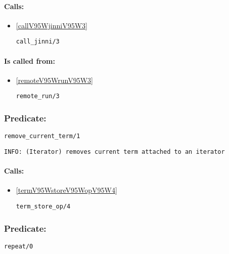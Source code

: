 \paragraph{Calls:} 
\begin{itemize}
\item \ref{callV95WjinniV95W3} 
\begin{verbatim}
call_jinni/3
\end{verbatim}

\end{itemize}
\paragraph{Is called from:} 
\begin{itemize}
\item \ref{remoteV95WrunV95W3} 
\begin{verbatim}
remote_run/3
\end{verbatim}

\end{itemize}

\subsubsection{Predicate:} \label{removeV95WcurrentV95WtermV95W1}

\begin{verbatim}
remove_current_term/1
\end{verbatim}

{\small \begin{verbatim}
INFO: (Iterator) removes current term attached to an iterator

\end{verbatim}}
\paragraph{Calls:} 
\begin{itemize}
\item \ref{termV95WstoreV95WopV95W4} 
\begin{verbatim}
term_store_op/4
\end{verbatim}

\end{itemize}

\subsubsection{Predicate:} \label{repeatV95W0}

\begin{verbatim}
repeat/0
\end{verbatim}

